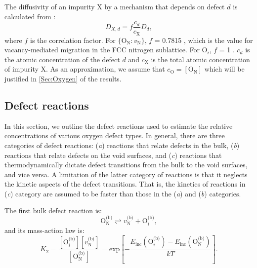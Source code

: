 \documentclass[preprint,12pt,sort&compress]{elsarticle}
\newcommand{\?}{\stackrel{?}{=}}
\begin{document}



The diffusivity of an impurity X by a mechanism that depends on defect $d$ is calculated from \cite{Cooper2023}:
\begin{equation}
D_{X, d} = f \frac{c_d}{c_\text{X}} D_d,
\end{equation}
where $f$ is the correlation factor. For $\{\text{O}_\text{N} \! : \! v_\text{N}\}$, $f$ = 0.7815 \cite{Laughlin2014}, which is the value for vacancy-mediated migration in the FCC nitrogen sublattice. For O$_i$, $f$ = 1 \cite{Laughlin2014}. $c_d$ is the atomic concentration of the defect $d$ and $c_\text{X}$ is the total atomic concentration of impurity X. As an approximation, we assume that $c_\text{O} = [\text{O}_\text{N}]$ which will be justified in \cref{Sec:Oxygen} of the results.

\subsection{Defect reactions}

In this section, we outline the defect reactions used to estimate the relative concentrations of various oxygen defect types. In general, there are three categories of defect reactions: (\textit{a}) reactions that relate defects in the bulk, (\textit{b}) reactions that relate defects on the void surfaces, and (\textit{c}) reactions that thermodynamically dictate defect transitions from the bulk to the void surfaces, and vice versa. A limitation of the latter category of reactions is that it neglects the kinetic aspects of the defect transitions. That is, the kinetics of reactions in (\textit{c}) category are assumed to be faster than those in the (\textit{a}) and (\textit{b}) categories. %

The first bulk defect reaction is:
\begin{equation}
\text{O}_\text{N}^\text{(b)} \rightleftharpoons v_\text{N}^\text{(b)} + \text{O}_i^\text{(b)},
\end{equation}
and its mass-action law is:
\begin{equation}
K_2 = \frac{ [ \text{O}_i^\text{(b)} ]  [ v_\text{N}^\text{(b)} ] } { [ \text{O}_\text{N}^\text{(b)} ] } = \text{exp}\! \left[ - \frac{ E_\text{inc}( \text{O}_i^\text{(b)} ) - E_\text{inc}( \text{O}_\text{N}^\text{(b)} ) } { k T } \right].
\end{equation}
\end{document}
